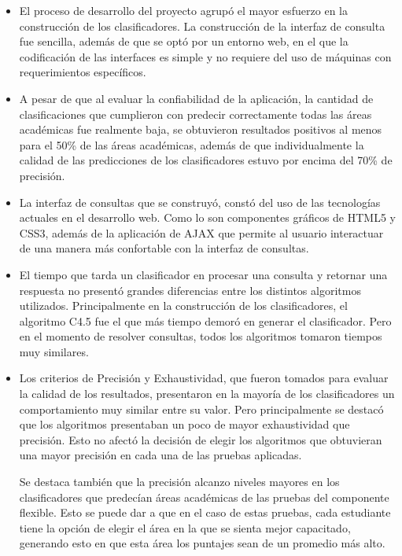 \begin{itemize}
\item El proceso de desarrollo del proyecto agrupó el mayor esfuerzo en la construcción de los clasificadores. La construcción de la interfaz de consulta fue sencilla, además de que se optó por un entorno web, en el que la codificación de las interfaces es simple y no requiere del uso de máquinas con requerimientos específicos.

\item A pesar de que al evaluar la confiabilidad de la aplicación, la cantidad de clasificaciones que cumplieron con predecir correctamente todas las áreas académicas fue realmente baja, se obtuvieron resultados positivos al menos para el 50\% de las áreas académicas, además de que individualmente la calidad de las predicciones de los clasificadores estuvo por encima del 70\% de precisión.

\item La interfaz de consultas que se construyó, constó del uso de las tecnologías actuales en el desarrollo web. Como lo son componentes gráficos de HTML5 y CSS3, además de la aplicación de AJAX que permite al usuario interactuar de una manera más confortable con la interfaz de consultas.

\item El tiempo que tarda un clasificador en procesar una consulta y retornar una respuesta no presentó grandes diferencias entre los distintos algoritmos utilizados. Principalmente en la construcción de los clasificadores, el algoritmo C4.5 fue el que más tiempo demoró en generar el clasificador. Pero en el momento de resolver consultas, todos los algoritmos tomaron tiempos muy similares.

\item Los criterios de Precisión y Exhaustividad, que fueron tomados para evaluar la calidad de los resultados, presentaron en la mayoría de los clasificadores un comportamiento muy similar entre su valor. Pero principalmente se destacó que los algoritmos presentaban un poco de mayor exhaustividad que precisión. Esto no afectó la decisión de elegir los algoritmos que obtuvieran una mayor precisión en cada una de las pruebas aplicadas.

Se destaca también que la precisión alcanzo niveles mayores en los clasificadores que predecían áreas académicas de las pruebas del componente flexible. Esto se puede dar a que en el caso de estas pruebas, cada estudiante tiene la opción de elegir el área en la que se sienta mejor capacitado, generando esto en que esta área los puntajes sean de un promedio más alto.
\end{itemize}
